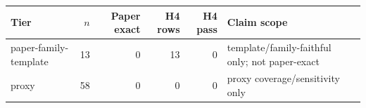 \begin{tabular}{lrrrrl}
\toprule
Tier & $n$ & Paper exact & H4 rows & H4 pass & Claim scope \\
\midrule
paper-family-template & 13 & 0 & 13 & 0 & template/family-faithful only; not paper-exact \\
proxy & 58 & 0 & 0 & 0 & proxy coverage/sensitivity only \\
\bottomrule
\end{tabular}
